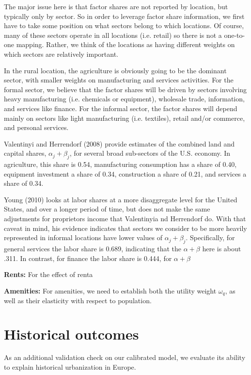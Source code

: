 \documentclass[10pt]{article}
\begin{document}
The major issue here is that factor shares are not reported by location, but typically only by sector. So in order to leverage factor share information, we first have to take some position on what sectors belong to which locations. Of course, many of these sectors operate in all locations (i.e. retail) so there is not a one-to-one mapping. Rather, we think of the locations as having different weights on which sectors are relatively important. 

In the rural location, the agriculture is obviously going to be the dominant sector, with smaller weights on manufacturing and services activities. For the formal sector, we believe that the factor shares will be driven by sectors involving heavy manufacturing (i.e. chemicals or equipment), wholesale trade, information, and services like finance. For the informal sector, the factor shares will depend mainly on sectors like light manufacturing (i.e. textiles), retail and/or commerce, and personal services. 

Valentinyi and Herrendorf (2008) provide estimates of the combined land and capital shares, $\alpha_j + \beta_j$, for several broad sub-sectors of the U.S. economy. In agriculture, this share is 0.54, manufacturing consumption has a share of 0.40, equipment investment a share of 0.34, construction a share of 0.21, and services a share of 0.34. 

Young (2010) looks at labor shares at a more disaggregate level for the United States, and over a longer period of time, but does not make the same adjustments for proprietors income that Valentinyia nd Herrendorf do. With that caveat in mind, his evidence indicates that sectors we consider to be more heavily represented in informal locations have lower values of $\alpha_j + \beta_j$. Specifically, for general services the labor share is 0.689, indicating that the $\alpha + \beta$ here is about .311. In contrast, for finance the labor share is 0.444, for $\alpha+\beta$

\textbf{Rents:} For the effect of renta

\textbf{Amenities:} For amenities, we need to establish both the utility weight $\omega_q$, as well as their elasticity with respect to population. 


\section{Historical outcomes}

As an additional validation check on our calibrated model, we evaluate its ability to explain historical urbanization in Europe. 
\end{document}
